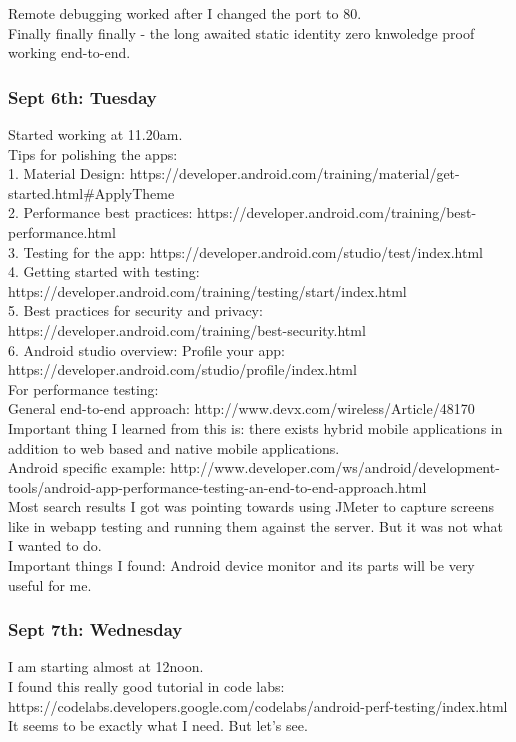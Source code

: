 \documentclass[11pt]{article}
\begin{document}
Remote debugging worked after I changed the port to 80.\\

Finally finally finally - the long awaited static identity zero knwoledge proof working end-to-end.\\

\subsubsection*{Sept 6th: Tuesday}
Started working at 11.20am.\\

Tips for polishing the apps: \\
1. Material Design: https://developer.android.com/training/material/get-started.html\#ApplyTheme \\
2. Performance best practices: https://developer.android.com/training/best-performance.html\\
3. Testing for the app: https://developer.android.com/studio/test/index.html\\
4. Getting started with testing: https://developer.android.com/training/testing/start/index.html\\
5. Best practices for security and privacy: https://developer.android.com/training/best-security.html\\
6. Android studio overview: Profile your app: https://developer.android.com/studio/profile/index.html\\

For performance testing:\\
General end-to-end approach: http://www.devx.com/wireless/Article/48170\\
Important thing I learned from this is: there exists hybrid mobile applications in addition to web based and native mobile applications.\\

Android specific example: http://www.developer.com/ws/android/development-tools/android-app-performance-testing-an-end-to-end-approach.html\\

Most search results I got was pointing towards using JMeter to capture screens like in webapp testing and running them against the server. But it was 
not what I wanted to do.\\

Important things I found: Android device monitor and its parts will be very useful for me.

\subsubsection*{Sept 7th: Wednesday}
I am starting almost at 12noon.\\
I found this really good tutorial in code labs: https://codelabs.developers.google.com/codelabs/android-perf-testing/index.html\\
It seems to be exactly what I need. But let's see. \\
\end{document}
